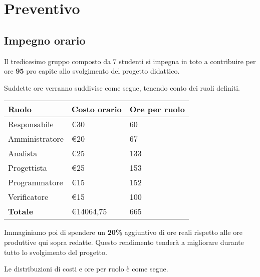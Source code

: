 \chapter{Preventivo}
\section{Impegno orario}

Il tredicesimo gruppo composto da 7 studenti si impegna in toto a contribuire per ore \textbf{95} pro capite allo svolgimento del progetto didattico.

Suddette ore verranno suddivise come segue, tenendo conto dei ruoli definiti.

\begin{center}
    \begin{tabularx}{10cm}{X |l|l}
        \textbf{Ruolo}  & \textbf{Costo orario} & \textbf{Ore per ruolo} \\
        \hline
        Responsabile    & €30                   & 60                     \\
        Amministratore  & €20                   & 67                     \\
        Analista        & €25                   & 133                    \\
        Progettista     & €25                   & 153                    \\
        Programmatore   & €15                   & 152                    \\
        Verificatore    & €15                   & 100                    \\
        \hline
        \textbf{Totale} & €14064,75             & 665
    \end{tabularx}
\end{center}

Immaginiamo poi di spendere un \textbf{20\%} aggiuntivo di ore reali rispetto alle ore produttive qui sopra redatte. Questo rendimento tenderà a migliorare durante tutto lo svolgimento del progetto.

Le distribuzioni di costi e ore per ruolo è come segue.


